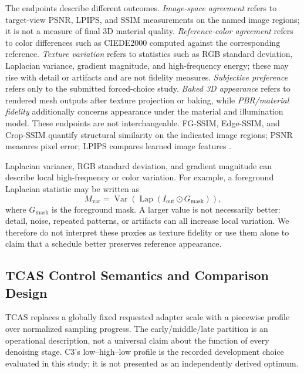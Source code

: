 \documentclass[times,twocolumn,final]{elsarticle}
\begin{document}
The endpoints describe different outcomes. \emph{Image-space agreement} refers to target-view PSNR, LPIPS, and SSIM measurements on the named image regions; it is not a measure of final 3D material quality. \emph{Reference-color agreement} refers to color differences such as CIEDE2000 computed against the corresponding reference. \emph{Texture variation} refers to statistics such as RGB standard deviation, Laplacian variance, gradient magnitude, and high-frequency energy; these may rise with detail or artifacts and are not fidelity measures. \emph{Subjective preference} refers only to the submitted forced-choice study. \emph{Baked 3D appearance} refers to rendered mesh outputs after texture projection or baking, while \emph{PBR/material fidelity} additionally concerns appearance under the material and illumination model. These endpoints are not interchangeable. FG-SSIM, Edge-SSIM, and Crop-SSIM quantify structural similarity on the indicated image regions; PSNR measures pixel error; LPIPS compares learned image features \cite{wang2004ssim,zhang2018lpips}.

Laplacian variance, RGB standard deviation, and gradient magnitude can describe local high-frequency or color variation. For example, a foreground Laplacian statistic may be written as
\begin{equation}
M_{\mathrm{var}}=\operatorname{Var}\!\left(\operatorname{Lap}(I_{\mathrm{out}}\odot G_{\mathrm{mask}})\right),
\end{equation}
where $G_{\mathrm{mask}}$ is the foreground mask. A larger value is not necessarily better: detail, noise, repeated patterns, or artifacts can all increase local variation. We therefore do not interpret these proxies as texture fidelity or use them alone to claim that a schedule better preserves reference appearance.

\subsection{TCAS Control Semantics and Comparison Design}
\label{subsec:tcas}

TCAS replaces a globally fixed requested adapter scale with a piecewise profile over normalized sampling progress. The early/middle/late partition is an operational description, not a universal claim about the function of every denoising stage. C3's low--high--low profile is the recorded development choice evaluated in this study; it is not presented as an independently derived optimum.
\end{document}
